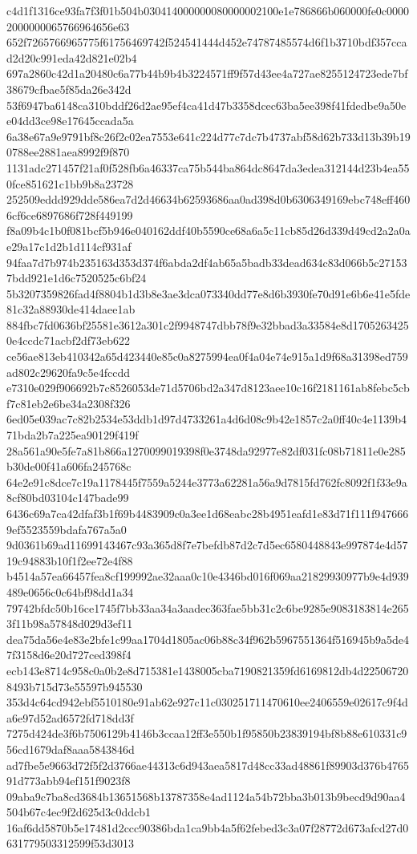 {c4d1f1316ce93fa7f3f01b504b030414000000080000002100e1e786866b060000fe0c00002000000065766964656e63
652f7265766965775f61756469742f524541444d452e74787485574d6f1b3710bdf357ccad2d20c991eda42d821e02b4
697a2860c42d1a20480c6a77b44b9b4b3224571ff9f57d43ee4a727ae8255124723ede7bf38679cfbae5f85da26e342d
53f6947ba6148ca310bddf26d2ae95ef4ca41d47b3358dcec63ba5ee398f41fdedbe9a50ee04dd3ce98e17645ccada5a
6a38e67a9e9791bf8c26f2c02ea7553e641c224d77c7dc7b4737abf58d62b733d13b39b190788ee2881aea8992f9f870
1131adc271457f21af0f528fb6a46337ca75b544ba864dc8647da3edea312144d23b4ea550fce851621c1bb9b8a23728
252509eddd929dde586ea7d2d46634b62593686aa0ad398d0b6306349169ebc748eff4606cf6ce6897686f728f449199
f8a09b4c1b0f081bcf5b946e040162ddf40b5590ce68a6a5c11cb85d26d339d49cd2a2a0ae29a17c1d2b1d114cf931af
94faa7d7b974b235163d353d374f6abda2df4ab65a5badb33dead634c83d066b5c271537bdd921e1d6c7520525c6bf24
5b3207359826fad4f8804b1d3b8e3ae3dca073340dd77e8d6b3930fe70d91e6b6e41e5fde81c32a88930de414daee1ab
884fbc7fd0636bf25581e3612a301c2f9948747dbb78f9e32bbad3a33584e8d17052634250e4ccdc71acbf2df73eb622
ce56ae813eb410342a65d423440e85c0a8275994ea0f4a04e74e915a1d9f68a31398ed759ad802c29620fa9c5e4fccdd
e7310e029f906692b7c8526053de71d5706bd2a347d8123aee10c16f2181161ab8febc5cbf7c81eb2e6be34a2308f326
6ed05e039ac7c82b2534e53ddb1d97d4733261a4d6d08c9b42e1857c2a0ff40c4e1139b471bda2b7a225ea90129f419f
28a561a90e5fe7a81b866a1270099019398f0e3748da92977e82df031fc08b71811e0e285b30de00f41a606fa245768c
64e2e91c8dce7c19a1178445f7559a5244e3773a62281a56a9d7815fd762fc8092f1f33e9a8cf80bd03104c147bade99
6436c69a7ca42dfaf3b1f69b4483909c0a3ee1d68eabc28b4951eafd1e83d71f111f9476669ef5523559bdafa767a5a0
9d0361b69ad11699143467c93a365d8f7e7befdb87d2c7d5ec6580448843e997874e4d5719c94883b10f1f2ee72e4f88
b4514a57ea66457fea8cf199992ae32aaa0c10e4346bd016f069aa21829930977b9e4d939489e0656c0c64bf98dd1a34
79742bfdc50b16ce1745f7bb33aa34a3aadec363fae5bb31c2c6be9285e9083183814e2653f11b98a57848d029d3ef11
dea75da56e4e83e2bfe1c99aa1704d1805ac06b88c34f962b5967551364f516945b9a5de47f3158d6e20d727ced398f4
ecb143e8714c958c0a0b2e8d715381e1438005cba7190821359fd6169812db4d225067208493b715d73e55597b945530
353d4c64cd942ebf5510180e91ab62e927c11c030251711470610ee2406559e02617c9f4da6e97d52ad6572fd718dd3f
7275d424de3f6b7506129b4146b3ccaa12ff3e550b1f95850b23839194bf8b88e610331c956cd1679daf8aaa5843846d
ad7fbe5e9663d72f5f2d3766ae44313c6d943aea5817d48cc33ad48861f89903d376b476591d773abb94ef151f9023f8
09aba9c7ba8cd3684b13651568b13787358e4ad1124a54b72bba3b013b9becd9d90aa4504b67c4ec9f2d625d3c0ddcb1
16af6dd5870b5e17481d2ccc90386bda1ca9bb4a5f62febed3c3a07f28772d673afcd27d0631779503312599f53d3013
}
